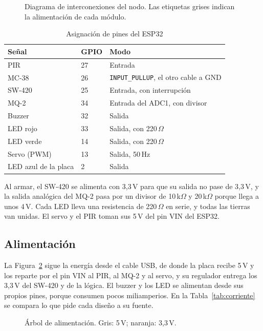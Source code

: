 \documentclass[manuscript,screen,nonacm]{acmart}
\begin{document}
\begin{figure}[htbp]
\centering
{}
\caption{Diagrama de interconexiones del nodo. Las etiquetas grises indican la alimentación de cada módulo.}
\label{fig:conexiones}
\end{figure}

\begin{table}[htbp]
\centering
\caption{Asignación de pines del ESP32}
\label{tab:pines}
\footnotesize
\renewcommand{\arraystretch}{1.15}
\begin{tabular}{@{}lll@{}}
\toprule
\textbf{Señal} & \textbf{GPIO} & \textbf{Modo} \\
\midrule
PIR & 27 & Entrada \\
MC-38 & 26 & \texttt{INPUT\_PULLUP}, el otro cable a GND \\
SW-420 & 25 & Entrada, con interrupción \\
MQ-2 & 34 & Entrada del ADC1, con divisor \\
Buzzer & 32 & Salida \\
LED rojo & 33 & Salida, con 220\,$\Omega$ \\
LED verde & 14 & Salida, con 220\,$\Omega$ \\
Servo (PWM) & 13 & Salida, 50\,Hz \\
LED azul de la placa & 2 & Salida \\
\bottomrule
\end{tabular}
\end{table}

Al armar, el SW-420 se alimenta con 3,3\,V para que su salida no pase de 3,3\,V, y la salida analógica del MQ-2 pasa por un divisor de 10\,k$\Omega$ y 20\,k$\Omega$ porque llega a unos 4\,V. Cada LED lleva una resistencia de 220\,$\Omega$ en serie, y todas las tierras van unidas. El servo y el PIR toman sus 5\,V del pin VIN del ESP32.

\subsection{Alimentación}
La Figura~\ref{fig:alimentacion} sigue la energía desde el cable USB, de donde la placa recibe 5\,V y los reparte por el pin VIN al PIR, al MQ-2 y al servo, y su regulador entrega los 3,3\,V del SW-420 y de la lógica. El buzzer y los LED se alimentan desde sus propios pines, porque consumen pocos miliamperios. En la Tabla~\ref{tab:corriente} se compara lo que pide cada diseño a su fuente.

\begin{figure}[htbp]
\centering
{}
\caption{Árbol de alimentación. Gris: 5\,V; naranja: 3,3\,V.}
\label{fig:alimentacion}
\end{figure}
\end{document}
